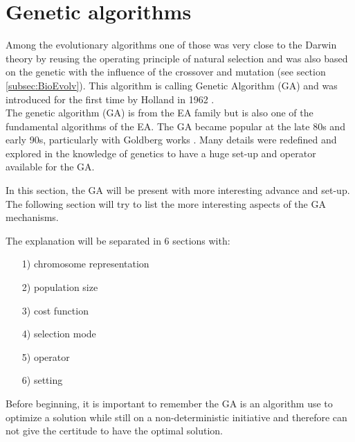 \section{Genetic algorithms} \label{sec:GAdetail}
Among the evolutionary algorithms one of those was very close to the Darwin theory by reusing the operating principle of natural selection and was also based on the genetic with the influence of the crossover and mutation (see section \ref{subsec:BioEvolv}). This algorithm is calling Genetic Algorithm (GA) and was introduced for the first time by Holland in 1962 \citep{111*holland1962}. \\
The genetic algorithm (GA) is from the EA family but is also one of the fundamental algorithms of the EA.
The GA became popular at the late 80s and early 90s, particularly with Goldberg works \cite{112*goldberg1989}. Many details were redefined and explored in the knowledge of genetics to have a huge set-up and operator available for the GA.


   

In this section, the GA will be present with more interesting advance and set-up. 
The following section will try to list the more interesting aspects of the GA mechanisms. 

 
 The explanation will be separated in 6 sections with:
\begin{itemize}
\item [1)] 	chromosome representation 
\item [2)]	population size 
\item [3)]	cost function 
\item [4)]	selection mode 
\item [5)]	operator 
\item [6)]	setting 

\end{itemize} 

Before beginning, it is important to remember the GA is an algorithm use to optimize a solution while still on a non-deterministic initiative and therefore can not give the certitude to have the optimal solution. 

